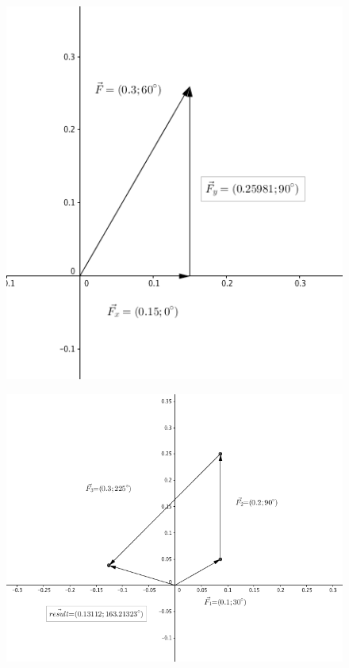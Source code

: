 \documentclass[11pt, titlepage]{article}
\begin{document}
\begin{figure}[p]
\centering
\hspace*{-10.5cm}
\includegraphics[scale=0.15, angle=0]{vector4.jpg}
\vspace*{19cm}
\end{figure}

\begin{figure}[p]
\centering
\hspace*{-10.5cm}
\includegraphics[scale=0.15, angle=0]{vector5.jpg}
\vspace*{19cm}
\end{figure}
\end{document}
